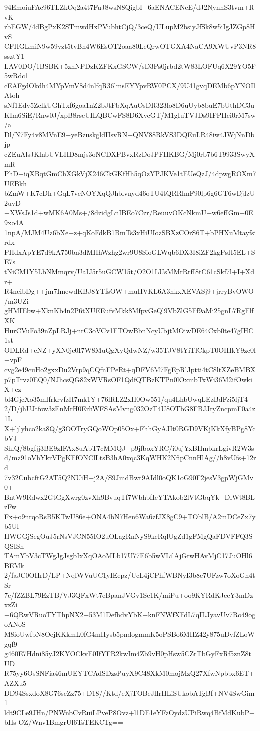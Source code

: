 94EmoiuFAc96TLZkOq2a4t7FuJ8wsN8QigbI+6aENACENcE/dJ2NynnS3tvm+RvK
rbEGW/4dBgPxK2STmwdHxPVubhtCjQ/3ceQ/ULupM2bsiyJfSk8w5iIgJZGp8HvS
CFHGLmiN9w59vzt5tvBn4W6EsOT2oaa80LeQrwOTGXA4NaCA9XWUvP3NR8ssztY1
LAV0DO/1BSBK+5znNPDzKZFKxGSCW/sD3Ps0jrbd2tW83LOFUq6X29YO5F5wRdc1
cEAFgdOkdh4MYpVmV8d4nlfqR36lmsEYYpvRW0PCX/9U41gvqDEMb6pYNOIlAtoh
sNf1Edv5ZclkUGhTxf6goa1nZ2bJtFbXqAuOsDR323lo8D6uUyb8buE7bUthDC3u
KIm6SiE/Rnw0J/xpB8rseUILQBCwFS8D6XvcGT/M1gIuTVJDs9IFPHei0rM7sw/a
Dl/N7Fy4v8MVnE9+yeBzuskgldIIsvRN+QNV88RkVS3DQEuLR48iw4JWjNnDbjp+
cZEuAlsJKlnbUVLHD8mjs3oNCDXPBvxRzDoJPFIIKBG/Mj0rb7b6T9933SwyXmR+
PhD+iqXBqtGmChXGkVjX246CkGKfHh5qOzYPJKVe1tEUeQzJ/4dpwgROXm7UEBkh
bZmW+K7cDh+GqL7veNOYXqQJhblvnyd46oTU4tQRRlmF90lp6g6GT6wDjIzU2uvD
+XWsJs1d+wMK6A0Ms+/8dzidgLnIBEo7Czr/ReuuvOKcNkmU+w6efIGm+0E9xo4A
1npA/MJM4Uz6bXe+z+qKoFdkB1BmTs3xHiUIozSBXzCOrS6T+bPHXuMtayfsirdx
PHdxApYE7d9kA750bn3dMHhWzhg2wr9U8SioGLWqb6DX3I8iZF2kgPsH5EL+SE7s
tNiCM1Y5LbNMmqrv/UaIJ5r5uGCW15t/O2O1LUsMMrRrfI8tC61cSkf7l+I+Xdr+
R4ncibDg++jm7ImewdKBJ8YTfsOW+muHVKL6A3hkxXEVASj9+jrryBvOWO/m3UZi
gHMIEbw+XknKb4n2P6tXUEEufvMkk8MfpvGeQl9VbZlG5Ff9aMi25gnL7RgFlfXK
HurCVuFo39nZpLRJj+nrC3oVCv1FTOwBbnNcyUbjtMOiwDE64Cxb0te47gIHC1st
ODLRd+eNZ+yXN0jc0I7W8MuQgXyQdwNZ/w35TJV8tYiTlCkpT0OIHkY9zc0l+vpF
cvg2e49cuHo2gxxDu2Vrp9qCQfnFPeRt+qDFV6M7FgEpRlJptti4tC8ltXZeBMBX
p7pTrvz0EQ0/NJhcsQG82xWVRsOF1QdfQTBzKTPn0lOxmbTxWi36M2ifOwkiX+ez
bl4GjcXo35mIfrkrvfzH7mk1Y+76lRLZ2xH0Ow551/qu4LhbUwqLEzBdFzi5ljT4
2/D/jhUJtfow3zEnMrH0ErhWFSAsMvng032OzT4U8OTbG8FBJJtyZncpmF0a4z1L
X+ljlyhco2ka8Q/g3OOTryGQoWOp05Ox+FhhGyAJIt0RGD9VKjKkXfyBPg8YcbVJ
ShlQ/8bgfjj3BE9zIFAx8uAbT7cMMQJ+p9jfboxYRC/i0ujYxBHmbkrLgivR2W3s
d/mz91oVhYkrVPgKFfONClLtsB3hA0xqc3KqWHK2NfipCnnHlAg//h8vUfs+12rd
7v32CubcftG2AT5Q2NUiH+j2A/S9JmdBwt9AIdl0oQK1oG90F2jesV3gpWjGMv0+
BntW9Rdwx2GtGgXwrg0zvXh9BvuqTf7WbhbfIeYTAkob2lVtGbqYk+DlWt8BLzFw
Fx+o9nrqoRsB5KTwU86e+ONA4bN7Hen6Wa6zfJX8gC9+TOblB/A2mDCeZx7yb5Ul
HWGGjSegOuJ5rNsVJCN55IO2uOLagRnNyS9kcRqlUgZd1gFMgQaFDVFFQ3SQSISn
TAmYbV3cTWgJgJsgbIxXqOAoMLb17U77E6b5wVLilAjGtwHAvMjC17JuOHl6BEMk
2/faJC0OHrD/LP+NqlWVuUC1yIEepz/UcL4jCPhfWBNyI3b8e7UFzw7oXoGh4tSr
7c/fZZBL79EzTB/VJ3QFxWt7eBpanJVGv1Se1K/miPu+oo9KYRdKJccY3mDzxzZi
+6QRwVRuoTYThpNX2+53M1DefhdvYbK+knFNWfXFdL7qILJyavUv7Ro49ogoANoS
M8ioUwfbN8OejKKkmL0fG4mHysb5pndogmmK5oPSBo6MHZ42y875uDvfZLoWgqf9
g460E7Hdni85yJ2KYOCkvE0IfYFR2kwIm4Zb9vH0pHsw5CZrTbGyFxRf5znZ8tUD
R75yy6OsSNFia46mUEYTCAdSDzsPuyX9C48XkM0mojMzQ27XfwNpbbx6ET+AZXu5
DD94SsxdoX8G76seZz75+D18//Ktd/eXjTOBeJlIrHLiSUkobATgBf+NV4SwGim1
ldt9CLe9JHn/PNWnbCvRuiLPveP8Ovz+l1DE1eYFzOydzUPiRwq4BfMdKubP+bHs
OZ/Wnv1BmgrUl6TsTEKCTg==
